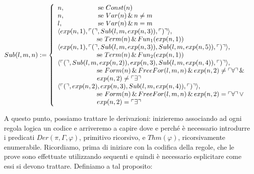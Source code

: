 {\tiny
\begin{displaymath}
Sub(l,m,n):= \left\{ { \begin{array}{l}
n, \hspace{1.8cm} \text{se $Const(n)$}\\
n, \hspace{1.8cm}\text {se $Var(n) \,\&\, n\ne m$} \\
l, \hspace{1.9cm}\text {se $Var(n) \,\&\, n= m$} \\
\langle exp(n,1), \ulcorner ( \urcorner, Sub(l,m,exp(n,3)), \ulcorner ) \urcorner \rangle,\\
\hspace{2.1cm}  \text{se $Term(n) \,\&\, Fun_1(exp(n,1))$}\\
\langle exp(n,1), \ulcorner ( \urcorner, Sub(l,m,exp(n,3)), Sub(l,m,exp(n,5)),\ulcorner ) \urcorner \rangle,\\
\hspace{2.1cm}  \text{se $Term(n) \,\&\, Fun_2(exp(n,1))$}\\
\langle \ulcorner ( \urcorner, Sub(l,m,exp(n,2)), exp(n,3), Sub(l,m,exp(n,4)),\ulcorner ) \urcorner \rangle,\\
\hspace{2.1cm}  \text{se $Form(n) \,\&\, FreeFor(l,m,n) \,\&\, exp(n,2)\ne \ulcorner \forall\urcorner \,\&\,$}\\
\hspace{2.1cm} \text{$exp(n,2)\ne \ulcorner \exists \urcorner$}\\
\langle \ulcorner ( \urcorner, exp(n,2), exp(n,3), Sub(l,m,exp(n,4)),\ulcorner ) \urcorner \rangle,\\
\hspace{2.1cm}  \text{se $Form(n) \,\&\, FreeFor(l,m,n) \,\&\, exp(n,2) = \ulcorner \forall\urcorner \,\vee\,$}\\
\hspace{2.1cm} 	\text{$exp(n,2) = \ulcorner \exists \urcorner$}\\
\end{array}}\right.
\end{displaymath}}



A questo punto, possiamo trattare le derivazioni: inizieremo associando ad ogni regola logica un codice e arriveremo a capire dove e perch\'e \`e necessario introdurre i predicati $Der(\pi,\Gamma,\varphi)$, primitivo ricorsivo, e $Thm(\varphi)$, ricorsivamente enumerabile.
Ricordiamo, prima di iniziare con la codifica della regole, che le prove sono effettuate utilizzando sequenti e quindi \`e necessario esplicitare come essi si devono trattare. Definiamo a tal proposito:

